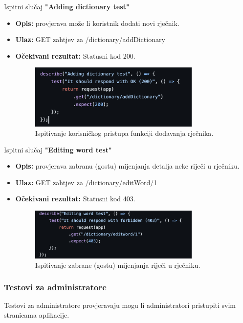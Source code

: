 			Ispitni slučaj \textbf{"Adding dictionary test"}
			\begin{itemize}
				\item \textbf{Opis:} provjerava može li koristnik dodati novi rječnik.
				\item \textbf{Ulaz:} GET zahtjev za /dictionary/addDictionary
				\item \textbf{Očekivani rezultat:} Statusni kod 200.
				\begin{figure}[h]
					\centering
					\includegraphics[width=0.8\textwidth]{slike/testovi/user_add_dictionary_test.png}
					\caption{Ispitivanje korisničkog pristupa funkciji dodavanja rječnika.}
					\label{fig:testovi_korisnik_slika}
				\end{figure}
			\end{itemize}

			Ispitni slučaj \textbf{"Editing word test"}
			\begin{itemize}
				\item \textbf{Opis:} provjerava zabranu (gostu) mijenjanja detalja neke riječi u rječniku.
				\item \textbf{Ulaz:} GET zahtjev za /dictionary/editWord/1
				\item \textbf{Očekivani rezultat:} Statusni kod 403.
				\begin{figure}[h]
					\centering
					\includegraphics[width=0.8\textwidth]{slike/testovi/user_edit_word_test.png}
					\caption{Ispitivanje zabrane (gostu) mijenjanja riječi u rječniku.}
					\label{fig:testovi_korisnik_slika}
				\end{figure}
			\end{itemize}

			\subsubsection{Testovi za administratore}
			Testovi za administratore provjeravaju mogu li administratori  pristupiti svim stranicama aplikacije.
			\\

